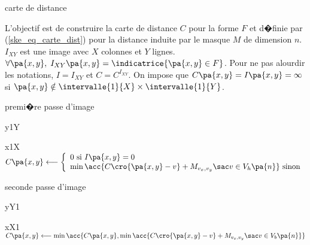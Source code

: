         \begin{xalgorithm}{carte de distance}
        \label{ske_algo_cart_dist}
        
        L'objectif est de construire la carte de distance $C$ pour la forme $F$ et d�finie par
        (\ref{ske_eq_carte_dist}) pour la distance induite par le masque $M$ de dimension $n$. 
        $I_{XY}$ est une image avec $X$ colonnes et $Y$ lignes. 
        $\forall \pa{x,y}, \; I_{XY}\pa{x,y} = \indicatrice{\pa{x,y} \in F}$. 
        Pour ne pas alourdir les notations, $I = I_{XY}$ et $C = C^{I_{XY}}$. 
        On impose que $C\pa{x,y} = I\pa{x,y} = \infty$ si $\pa{x,y} \notin \intervalle{1}{X} \times \intervalle{1}{Y}$. 
        
        \begin{xalgostep}{premi�re passe d'image}
                \begin{xfor}{y}{1}{Y}
                    \begin{xfor}{x}{1}{X}
                    $C\pa{x,y} \longleftarrow \left\{ \begin{array}{l}
                                                                    0 \text{ si } I\pa{x,y} = 0 \\
                                                                    \min  \acc{ C\cro{ \pa{x,y} - v} + M_{v_x,v_y} 
                                                                                \sac v \in V_h\pa{n}} \text{ sinon}
                                                                    \end{array}\right.$ 
                    \end{xfor}
                \end{xfor}
        \end{xalgostep}
        
        \begin{xalgostep}{seconde passe d'image}
                \begin{xfor}{y}{Y}{1}
                    \begin{xfor}{x}{X}{1}
                    $C\pa{x,y} \longleftarrow \min\acc{ C\pa{x,y},  \min  
                                \acc{ C\cro{ \pa{x,y} - v} + M_{v_x,v_y} \sac v \in V_b\pa{n}}}$ 
                    \end{xfor}
                \end{xfor}
        \end{xalgostep}
        
        \end{xalgorithm}
        


